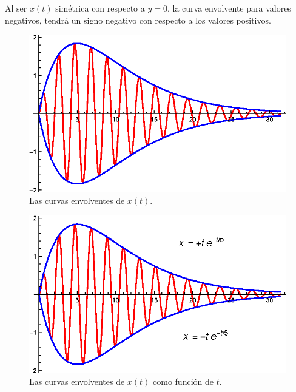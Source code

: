 Al ser $x(t)$ simétrica con respecto a $y = 0$, la curva envolvente para valores negativos, tendrá un signo negativo con respecto a los valores positivos.
\begin{figure}[H]
    \centering
    \includegraphics[scale=1]{Imagenes/Ejemplo_Resonancia_04.eps}
    \caption{Las curvas envolventes de $x(t)$.}
\end{figure}


\begin{figure}[H]
    \centering
    \includegraphics[scale=1]{Imagenes/Ejemplo_Resonancia_05.eps}
    \caption{Las curvas envolventes de $x(t)$ como función de $t$.}
\end{figure}



